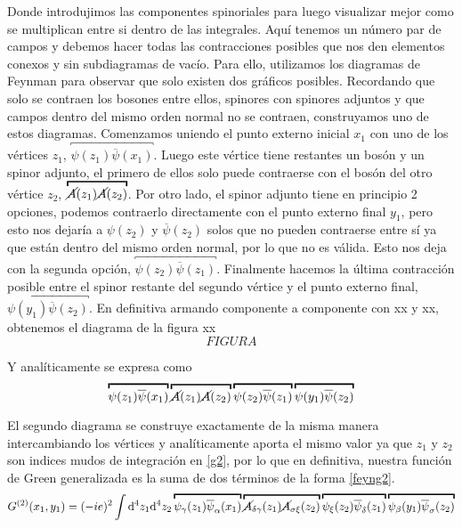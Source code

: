 \documentclass{article}
\numberwithin{equation}{section}
\begin{document}
Donde introdujimos las componentes spinoriales para luego visualizar mejor como se multiplican entre si dentro de las integrales. Aquí tenemos un número par de campos y debemos hacer todas las
contracciones posibles que nos den elementos conexos y sin subdiagramas
de vacío. Para ello, utilizamos los diagramas de Feynman para observar
que solo existen dos gráficos posibles. Recordando que solo se contraen
los bosones entre ellos, spinores con spinores adjuntos y que campos
dentro del mismo orden normal no se contraen, construyamos uno de
estos diagramas. Comenzamos uniendo el punto externo inicial $x_{1}$
con uno de los vértices $z_{1}$, $\overbracket{\psi(z_{1})\overline{\psi}(x_{1})}$.
Luego este vértice tiene restantes un bosón y un spinor adjunto, el
primero de ellos solo puede contraerse con el bosón del otro vértice
$z_{2}$, $\overbracket{\cancel{A}(z_{1})\cancel{A}(z_{2})}$. Por otro lado, el
spinor adjunto tiene en principio 2 opciones, podemos contraerlo directamente
con el punto externo final $y_{1}$, pero esto nos dejaría a $\psi(z_{2})$
y $\overline{\psi}(z_{2})$ solos que no pueden contraerse entre sí
ya que están dentro del mismo orden normal, por lo que no es válida.
Esto nos deja con la segunda opción, $\overbracket{\psi(z_{2})\overline{\psi}(z_{1})}$.
Finalmente hacemos la última contracción posible entre el spinor restante
del segundo vértice y el punto externo final, $\overbracket{\psi(y_{1})\overline{\psi}(z_{2})}$.
En definitiva armando componente a componente con xx y xx, obtenemos
el diagrama de la figura xx
\begin{equation}
FIGURA
\end{equation}

Y analíticamente se expresa como 
\begin{equation}\label{feyng2}
\overbracket{\psi(z_{1})\overline{\psi}(x_{1})}\overbracket{\cancel{A}(z_{1})\cancel{A}(z_{2})}\overbracket{\psi(z_{2})\overline{\psi}(z_{1})}\overbracket{\psi(y_{1})\overline{\psi}(z_{2})}
\end{equation}

El segundo diagrama se construye exactamente de la misma manera intercambiando
los vértices y analíticamente aporta el mismo valor ya que $ z_1 $ y $ z_2 $ son indices mudos de integración en \ref{g2}, por lo que en
definitiva, nuestra función de Green generalizada es la suma de dos
términos de la forma \ref{feyng2}.
\begin{equation}
G^{(2)}(x_{1},y_{1})=(-ie)^{2}\int \mathrm{d^4}z_{1}\mathrm{d^4}z_{2}\overbracket{\psi_{\gamma}(z_{1})\overline{\psi}_{\alpha}(x_{1})}\overbracket{\cancel{A}_{\delta\gamma}(z_{1})\cancel{A}_{\sigma\xi}(z_{2})}\overbracket{\psi_{\xi}(z_{2})\overline{\psi}_{\delta}(z_{1})}\overbracket{\psi_{\beta}(y_{1})\overline{\psi}_{\sigma}(z_{2})}
\end{equation}
\end{document}
